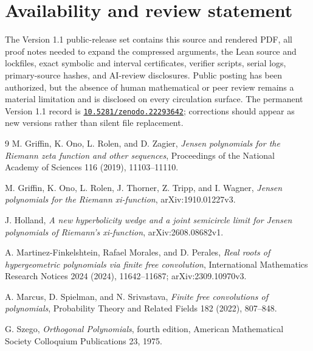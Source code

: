 \documentclass[11pt]{article}
\theoremstyle{definition}
\theoremstyle{remark}
\begin{document}
\section{Availability and review statement}

The Version 1.1 public-release set contains this source and rendered PDF,
all proof notes needed to expand the compressed arguments, the Lean source
and lockfiles, exact symbolic and interval certificates, verifier scripts,
serial logs, primary-source hashes, and AI-review disclosures.  Public
posting has been authorized, but the absence of human mathematical or peer
review remains a material limitation and is disclosed on every circulation
surface.  The permanent Version 1.1 record is
\href{https://doi.org/10.5281/zenodo.22293642}{\texttt{10.5281/zenodo.22293642}};
corrections should appear as new versions rather than silent file replacement.

\begin{thebibliography}{9}
M. Griffin, K. Ono, L. Rolen, and D. Zagier,
\emph{Jensen polynomials for the Riemann zeta function and other sequences},
Proceedings of the National Academy of Sciences 116 (2019), 11103--11110.

M. Griffin, K. Ono, L. Rolen, J. Thorner, Z. Tripp, and I. Wagner,
\emph{Jensen polynomials for the Riemann xi-function},
arXiv:1910.01227v3.

J. Holland,
\emph{A new hyperbolicity wedge and a joint semicircle limit for Jensen
polynomials of Riemann's xi-function}, arXiv:2608.08682v1.

A. Martinez-Finkelshtein, Rafael Morales, and D. Perales,
\emph{Real roots of hypergeometric polynomials via finite free convolution},
International Mathematics Research Notices 2024 (2024), 11642--11687;
arXiv:2309.10970v3.

A. Marcus, D. Spielman, and N. Srivastava,
\emph{Finite free convolutions of polynomials},
Probability Theory and Related Fields 182 (2022), 807--848.

G. Szego, \emph{Orthogonal Polynomials}, fourth edition,
American Mathematical Society Colloquium Publications 23, 1975.
\end{thebibliography}
\end{document}
